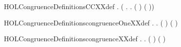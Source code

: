 \newcommand{\HOLCongruenceDate}{24 Luglio 2018}
\newcommand{\HOLCongruenceTime}{15:33}
\begin{SaveVerbatim}{HOLCongruenceDefinitionsCCXXdef}
\HOLTokenTurnstile{} \HOLSymConst{\HOLTokenForall{}}.   \HOLSymConst{=} (\HOLTokenLambda{} . \HOLSymConst{\HOLTokenForall{}}.   \HOLSymConst{\HOLTokenImp{}}  ( ) ( ))
\end{SaveVerbatim}
\newcommand{\HOLCongruenceDefinitionsCCXXdef}{\UseVerbatim{HOLCongruenceDefinitionsCCXXdef}}
\begin{SaveVerbatim}{HOLCongruenceDefinitionscongruenceOneXXdef}
\HOLTokenTurnstile{} \HOLSymConst{\HOLTokenForall{}}.
         \HOLSymConst{\HOLTokenEquiv{}}
         \HOLSymConst{\HOLTokenConj{}}
       \HOLSymConst{\HOLTokenForall{}}  .   \HOLSymConst{\HOLTokenImp{}}    \HOLSymConst{\HOLTokenImp{}}  ( ) ( )
\end{SaveVerbatim}
\newcommand{\HOLCongruenceDefinitionscongruenceOneXXdef}{\UseVerbatim{HOLCongruenceDefinitionscongruenceOneXXdef}}
\begin{SaveVerbatim}{HOLCongruenceDefinitionscongruenceXXdef}
\HOLTokenTurnstile{} \HOLSymConst{\HOLTokenForall{}}.
         \HOLSymConst{\HOLTokenEquiv{}}
         \HOLSymConst{\HOLTokenConj{}}
       \HOLSymConst{\HOLTokenForall{}}  .   \HOLSymConst{\HOLTokenImp{}}    \HOLSymConst{\HOLTokenImp{}}  ( ) ( )
\end{SaveVerbatim}
\newcommand{\HOLCongruenceDefinitionscongruenceXXdef}{\UseVerbatim{HOLCongruenceDefinitionscongruenceXXdef}}
